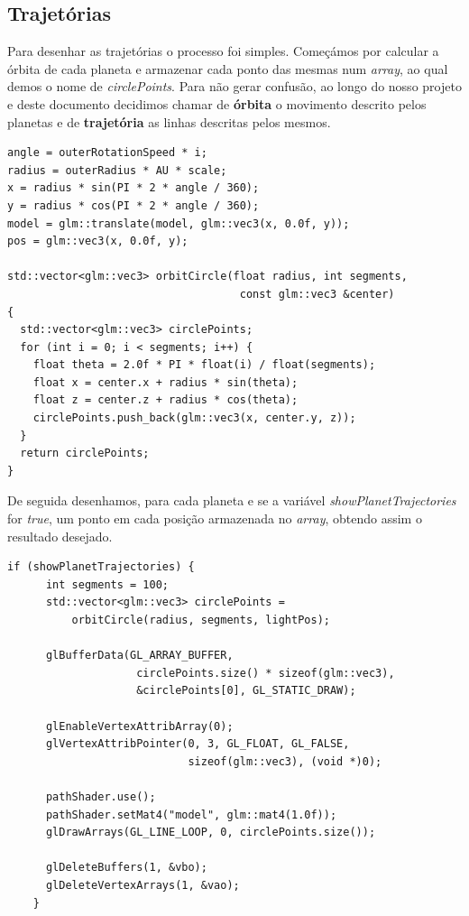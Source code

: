 \subsection{Trajetórias}
\label{chap2:sec:traj}

\noindent
Para desenhar as trajetórias o processo foi simples. Começámos por calcular a órbita de cada planeta e armazenar cada ponto das mesmas num \textit{array}, ao qual demos o nome de \textit{circlePoints}.
Para não gerar confusão, ao longo do nosso projeto e deste documento decidimos chamar de \textbf{órbita} o movimento descrito pelos planetas e de \textbf{trajetória} as linhas descritas pelos mesmos.

\begin{lstlisting}[caption = Cálculo da órbita e \textit{Array circlePoints}]
angle = outerRotationSpeed * i;
radius = outerRadius * AU * scale;
x = radius * sin(PI * 2 * angle / 360);
y = radius * cos(PI * 2 * angle / 360);
model = glm::translate(model, glm::vec3(x, 0.0f, y));
pos = glm::vec3(x, 0.0f, y);

std::vector<glm::vec3> orbitCircle(float radius, int segments, 
                                    const glm::vec3 &center) 
{
  std::vector<glm::vec3> circlePoints;
  for (int i = 0; i < segments; i++) {
    float theta = 2.0f * PI * float(i) / float(segments);
    float x = center.x + radius * sin(theta);
    float z = center.z + radius * cos(theta);
    circlePoints.push_back(glm::vec3(x, center.y, z));
  }
  return circlePoints;
}
\end{lstlisting}

\noindent
De seguida desenhamos, para cada planeta e se a variável \textit{showPlanetTrajectories} for \textit{true}, um ponto em cada posição armazenada no \textit{array}, obtendo assim o resultado desejado.

\begin{lstlisting}[caption = Desenho das trajetórias]
if (showPlanetTrajectories) {
      int segments = 100;
      std::vector<glm::vec3> circlePoints =
          orbitCircle(radius, segments, lightPos);

      glBufferData(GL_ARRAY_BUFFER, 
                    circlePoints.size() * sizeof(glm::vec3), 
                    &circlePoints[0], GL_STATIC_DRAW);

      glEnableVertexAttribArray(0);
      glVertexAttribPointer(0, 3, GL_FLOAT, GL_FALSE, 
                            sizeof(glm::vec3), (void *)0);

      pathShader.use();
      pathShader.setMat4("model", glm::mat4(1.0f));
      glDrawArrays(GL_LINE_LOOP, 0, circlePoints.size());

      glDeleteBuffers(1, &vbo);
      glDeleteVertexArrays(1, &vao);
    }
\end{lstlisting}

